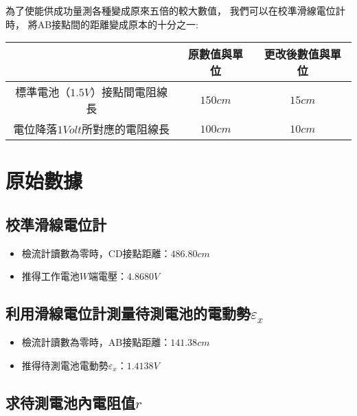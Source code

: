 \documentclass[12pt]{article}
\begin{document}
\begin{enumerate}
                為了使能供成功量測各種變成原來五倍的較大數值，
                我們可以在校準滑線電位計時，
                將AB接點間的距離變成原本的十分之一:

                \begin{center}
                        \begin{tabular}{|c|c|c|}
                        \hline
                        & 原數值與單位 & 更改後數值與單位\\ \hline
                        標準電池（$1.5V$）接點間電阻線長 & $150cm$ & $15cm$\\ \hline
                        電位降落$1Volt$所對應的電阻線長 & $100cm$ & $10cm$ \\ \hline
                        \end{tabular}
                \end{center}
        \end{enumerate}
            
    \section{原始數據}
    \label{sec:data}

        \subsection{校準滑線電位計}
            
                \begin{itemize}
                    \item 檢流計讀數為零時，CD接點距離：$486.80cm$
                    \item 推得工作電池$W$端電壓：$4.8680V$
                \end{itemize}

        \subsection{利用滑線電位計測量待測電池的電動勢$\varepsilon_x$}
            
                \begin{itemize}
                    \item 檢流計讀數為零時，AB接點距離：$141.38cm$
                    \item 推得待測電池電動勢$\varepsilon_x$：$1.4138V$
                \end{itemize}

        \subsection{求待測電池內電阻值$r$}
\end{document}
